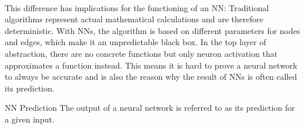 \\
This difference has implications for the functioning of an NN: Traditional algorithms represent actual mathematical calculations and are therefore deterministic.
With NNs, the algorithm is based on different parameters for nodes and edges, which make it an unpredictable black box.
In the top layer of abstraction, there are no concrete functions but only neuron activation that approximates a function instead.
This means it is hard to prove a neural network to always be accurate and is also the reason why the result of NNs is often called its prediction. \cite{springer_blackbox}%

\begin{mydef}{NN Prediction}
    The output of a neural network is referred to as its prediction for a given input.\cite{Warudkar2020}
\end{mydef}

